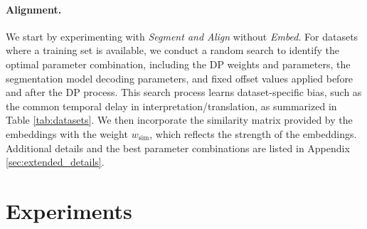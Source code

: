 \documentclass[11pt]{article}
\begin{document}
\paragraph{Alignment.}
We start by experimenting with \textit{Segment and Align} without \textit{Embed}. 
For datasets where a training set is available, we conduct a random search to identify the optimal parameter combination, including the DP weights and parameters, the segmentation model decoding parameters, and fixed offset values applied before and after the DP process.
This search process learns dataset-specific bias, such as the common temporal delay in interpretation/translation, as summarized in Table \ref{tab:datasets}.
We then incorporate the similarity matrix provided by the embeddings with the weight $w_{\mathrm{sim}}$, which reflects the strength of the embeddings.
Additional details and the best parameter combinations are listed in Appendix \ref{sec:extended_details}.


\section{Experiments}\label{sec:exp}
\end{document}
